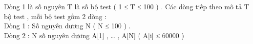 Dòng 1 là số nguyên T là số bộ test ( 1 ≤ T ≤ 100 ) . Các dòng tiếp theo mô tả T bộ test , mỗi bộ test gồm 2 dòng :
\\Dòng 1 : Số nguyên dương N ( N ≤ 100 ) .
\\Dòng 2 : N số nguyên dương A[1] , … , A[N] ( A[i] ≤ 60000 )